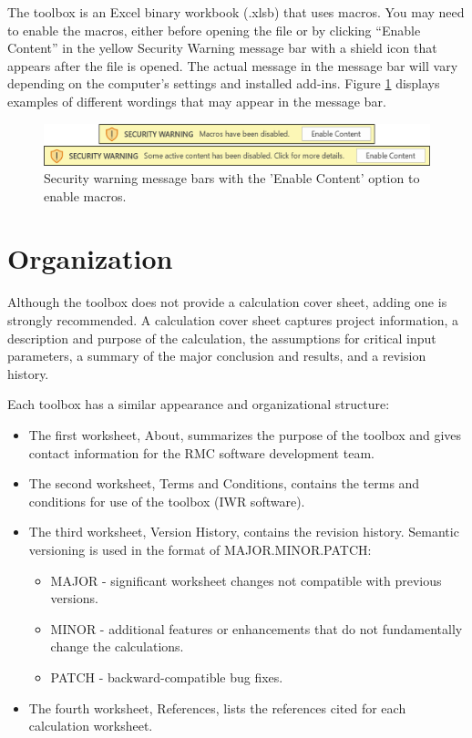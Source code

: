 \documentclass[
]{book}
\begin{document}
The toolbox is an Excel binary workbook (.xlsb) that uses macros. You may need to enable the macros, either before opening the file or by clicking ``Enable Content'' in the yellow Security Warning message bar with a shield icon that appears after the file is opened. The actual message in the message bar will vary depending on the computer's settings and installed add-ins. Figure \ref{fig:figure-1} displays examples of different wordings that may appear in the message bar.

\begin{figure}

{\centering \includegraphics[width=1\linewidth]{images/figure1} 

}

\caption{Security warning message bars with the 'Enable Content' option to enable macros.}\label{fig:figure-1}
\end{figure}

\section{Organization}\label{organization}

Although the toolbox does not provide a calculation cover sheet, adding one is strongly recommended. A calculation cover sheet captures project information, a description and purpose of the calculation, the assumptions for critical input parameters, a summary of the major conclusion and results, and a revision history.

Each toolbox has a similar appearance and organizational structure:

\begin{itemize}
\item
  The first worksheet, About, summarizes the purpose of the toolbox and gives contact information for the RMC software development team.
\item
  The second worksheet, Terms and Conditions, contains the terms and conditions for use of the toolbox (IWR software).
\item
  The third worksheet, Version History, contains the revision history. Semantic versioning is used in the format of MAJOR.MINOR.PATCH:

  \begin{itemize}
  \item
    MAJOR - significant worksheet changes not compatible with previous versions.
  \item
    MINOR - additional features or enhancements that do not fundamentally change the calculations.
  \item
    PATCH - backward-compatible bug fixes.
  \end{itemize}
\item
  The fourth worksheet, References, lists the references cited for each calculation worksheet.
\end{itemize}
\end{document}
